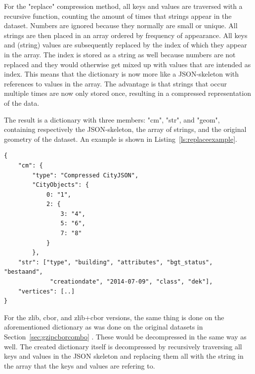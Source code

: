 For the "replace" compression method, all keys and values are traversed with a recursive function, counting the amount of times that strings appear in the dataset.
Numbers are ignored because they normally are small or unique.
All strings are then placed in an array ordered by frequency of appearance.
All keys and (string) values are subsequently replaced by the index of which they appear in the array.
The index is stored as a string as well because numbers are not replaced and they would otherwise get mixed up with values that are intended as index.
This means that the dictionary is now more like a JSON-skeleton with references to values in the array.
The advantage is that strings that occur multiple times are now only stored once, resulting in a compressed representation of the data.

The result is a dictionary with three members: "cm", "str", and "geom", containing respectively the JSON-skeleton, the array of strings, and the original geometry of the dataset.
An example is shown in Listing~\ref{ls:replaceexample}.

\newpage


\begin{lstlisting}[frame=single,style=base,caption={Example of dataset compressed with replace method}, label=ls:replaceexample]
{
    "cm": {
        "type": "Compressed CityJSON",
        "CityObjects": {
            0: "1",
            2: {
                3: "4",
                5: "6",
                7: "8"
            }
        },
    "str": ["type", "building", "attributes", "bgt_status", "bestaand",
             "creationdate", "2014-07-09", "class", "dek"],
    "vertices": [..]
}
\end{lstlisting}

For the zlib, cbor, and zlib+cbor versions, the same thing is done on the aforementioned dictionary as was done on the original datasets in Section~\ref{sec:gzipcborcombo} .
These would be decompressed in the same way as well.
The created dictionary itself is decompressed by recursively traversing all keys and values in the JSON skeleton and replacing them all with the string in the array that the keys and values are refering to.



